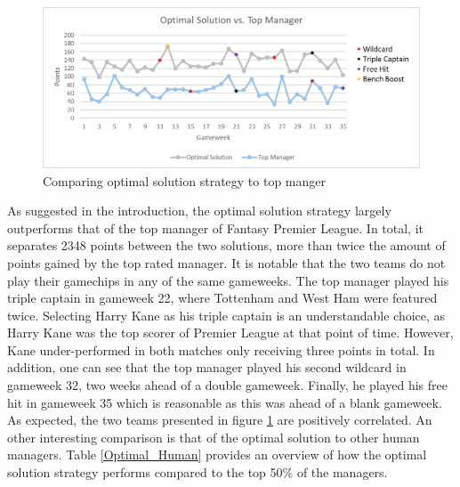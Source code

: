 \begin{figure}[H]
\label{fig:Top_Manager}
    \centering
    \includegraphics[scale=0.75]{fig/chapter_7/Optimal_vs_Top_colour.png}
    \caption{Comparing optimal solution strategy to top manger}
\label{Top_Manager}    
\end{figure}

As suggested in the introduction, the optimal solution strategy largely outperforms that of the top manager of Fantasy Premier League. In total, it separates 2348 points between the two solutions, more than twice the amount of points gained by the top rated manager. It is notable that the two teams do not play their gamechips in any of the same gameweeks. The top manager played his triple captain in gameweek 22, where Tottenham and West Ham were featured twice. Selecting Harry Kane as his triple captain is an understandable choice, as Harry Kane was the top scorer of Premier League at that point of time. However, Kane under-performed in both matches only receiving three points in total. In addition, one can see that the top manager played his second wildcard in gameweek 32, two weeks ahead of a double gameweek. Finally, he played his free hit in gameweek 35 which is reasonable as this was ahead of a blank gameweek. As expected, the two teams presented in figure \ref{Top_Manager} are positively correlated.   
\newpar
An other interesting comparison is that of the optimal solution to other human managers. Table \ref{Optimal_Human} provides an overview of how the optimal solution strategy performs compared to the top 50\% of the managers. 

